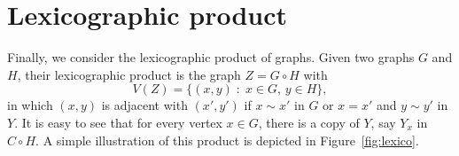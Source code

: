 \documentclass[12pt,a4paper, longbibliography]{article}
\theoremstyle{definition}
\numberwithin{equation}{section}
\begin{document}
	
	
	

	\section{Lexicographic product}\label{lexico}
	
	Finally, we consider the  lexicographic product of graphs. Given two graphs $G$ and $H$, their lexicographic product is the graph  $Z=G\circ H$  with 
	\[
	V(Z)= \{ (x,y)\; :\; x \in G,\, y\in H\},
	\]
	in which $(x,y)$ is adjacent with $(x',y')$ if  $x\sim x'$ in $G$  or  $x = x'$ and  $y\sim y'$ in $Y$. It is easy to see that for every vertex $x\in G$, there is a copy of $Y$, say $Y_x$ in $C\circ H$.
	A simple illustration of this product is depicted in Figure~\ref{fig:lexico}.
	
\end{document}
